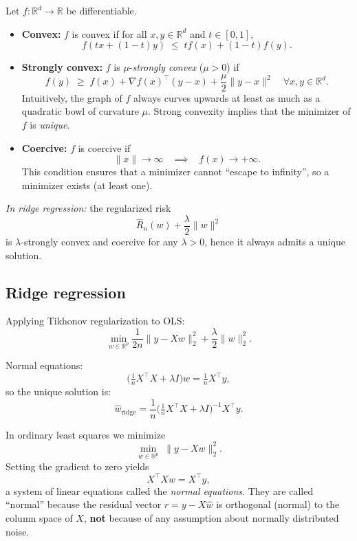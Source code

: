 \begin{remark}
Let $f:\mathbb{R}^d \to \mathbb{R}$ be differentiable.
\begin{itemize}
  \item \textbf{Convex:} $f$ is convex if for all $x,y\in\mathbb{R}^d$ and $t\in[0,1]$,
  \[
  f(tx+(1-t)y) \;\leq\; t f(x) + (1-t)f(y).
  \]

  \item \textbf{Strongly convex:} $f$ is $\mu$-\emph{strongly convex} ($\mu>0$) if
  \[
  f(y) \;\geq\; f(x) + \nabla f(x)^\top (y-x) + \frac{\mu}{2}\|y-x\|^2
  \quad \forall x,y\in\mathbb{R}^d.
  \]
  Intuitively, the graph of $f$ always curves upwards at least as much as a quadratic bowl of curvature $\mu$.
  Strong convexity implies that the minimizer of $f$ is \emph{unique}.

  \item \textbf{Coercive:} $f$ is coercive if
  \[
  \|x\| \to \infty \;\;\;\implies\;\;\; f(x) \to +\infty.
  \]
  This condition ensures that a minimizer cannot ``escape to infinity'',
  so a minimizer exists (at least one).
\end{itemize}

\noindent
\emph{In ridge regression:} the regularized risk
\[
\hat R_n(w) + \frac{\lambda}{2}\|w\|^2
\]
is $\lambda$-strongly convex and coercive for any $\lambda>0$,
hence it always admits a unique solution.
\end{remark}


\subsection*{Ridge regression}
Applying Tikhonov regularization to OLS:
\[
\min_{w\in\mathbb{R}^p} \frac{1}{2n}\|y - Xw\|_2^2 + \frac{\lambda}{2}\|w\|_2^2.
\]

Normal equations:
\[
\Big(\tfrac{1}{n}X^\top X + \lambda I\Big)w = \tfrac{1}{n}X^\top y,
\]
so the unique solution is:
\[
\hat w_{\text{ridge}} = \frac{1}{n}\Big(\tfrac{1}{n}X^\top X + \lambda I\Big)^{-1}X^\top y.
\]

\begin{remark}
In ordinary least squares we minimize
\[
\min_{w \in \mathbb{R}^p} \; \|y - Xw\|_2^2.
\]
Setting the gradient to zero yields
\[
X^\top X w = X^\top y,
\]
a system of linear equations called the \emph{normal equations}.
They are called ``normal'' because the residual vector
$r = y - X\hat w$ is orthogonal (normal) to the column space of $X$,
\textbf{not} because of any assumption about normally distributed noise.
\end{remark}


